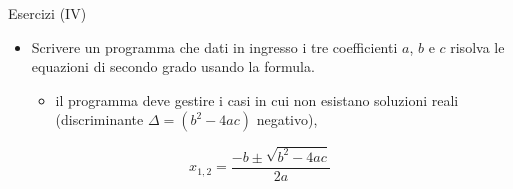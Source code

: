 \begin{frame}{Esercizi (IV)}
  \begin{itemize}
    \item Scrivere un programma che dati in ingresso i tre coefficienti 
	  $a$, $b$ e $c$ risolva le equazioni di secondo grado usando la formula.
    \begin{itemize}
      \item il programma deve gestire i casi in cui non esistano soluzioni reali
      (discriminante $\Delta = (b^2 - 4ac)$ negativo),
    \end{itemize}

  \end{itemize}

  \begin{equation*}
    x_{1,2} = \dfrac{-b \pm \sqrt{b^2 - 4ac}}{2a}
  \end{equation*}

\end{frame}
